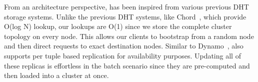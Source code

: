 From an architecture perspective, \projectname{} has been inspired from various previous DHT storage systems. Unlike the previous DHT systems, like Chord~\cite{chord}, which provide O(log N) lookup, our lookups are O(1) since we store the complete cluster topology on every node. This allows our clients to bootstrap from a random node and then direct requests to exact destination nodes. Similar to Dynamo~\cite{dynamo}, \projectname{} also supports per tuple based replication for availability purposes. Updating all of these replicas is effortless in the batch scenario since they are pre-computed and then loaded into a \projectname{} cluster at once. 

